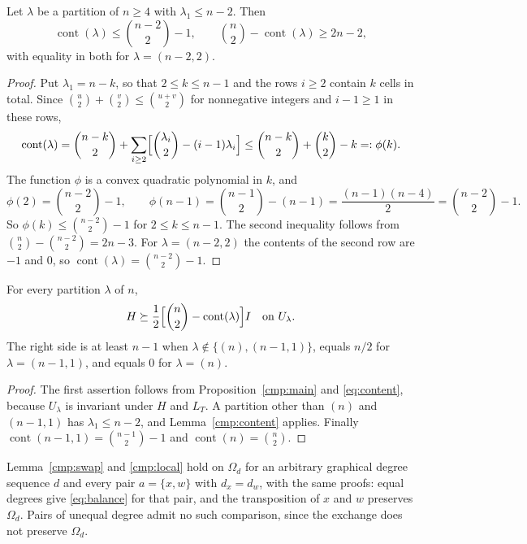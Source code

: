 \begin{lemma}\label{cmp:content}
Let $\lambda$ be a partition of $n\ge4$ with $\lambda_1\le n-2$. Then
\[
 \operatorname{cont}(\lambda)\le\binom{n-2}2-1,\qquad
 \binom n2-\operatorname{cont}(\lambda)\ge2n-2,
\]
with equality in both for $\lambda=(n-2,2)$.
\end{lemma}

\begin{proof}
Put $\lambda_1=n-k$, so that $2\le k\le n-1$ and the rows $i\ge2$ contain $k$
cells in total. Since $\binom u2+\binom v2\le\binom{u+v}2$ for nonnegative
integers and $i-1\ge1$ in these rows,
\[
 \operatorname{cont}(\lambda)
 =\binom{n-k}2+\sum_{i\ge2}\Bigl[\binom{\lambda_i}2-(i-1)\lambda_i\Bigr]
 \le\binom{n-k}2+\binom k2-k=:\phi(k).
\]
The function $\phi$ is a convex quadratic polynomial in $k$, and
\[
 \phi(2)=\binom{n-2}2-1,\qquad
 \phi(n-1)=\binom{n-1}2-(n-1)=\frac{(n-1)(n-4)}2=\binom{n-2}2-1 .
\]
So $\phi(k)\le\binom{n-2}2-1$ for $2\le k\le n-1$. The second inequality
follows from $\binom n2-\binom{n-2}2=2n-3$. For $\lambda=(n-2,2)$ the contents
of the second row are $-1$ and $0$, so
$\operatorname{cont}(\lambda)=\binom{n-2}2-1$.
\end{proof}

\begin{proposition}\label{cmp:sectors}
For every partition $\lambda$ of $n$,
\[
 H\succeq\frac12\Bigl[\binom n2-\operatorname{cont}(\lambda)\Bigr]I
 \quad\text{on }U_\lambda .
\]
The right side is at least $n-1$ when $\lambda\notin\{(n),(n-1,1)\}$, equals
$n/2$ for $\lambda=(n-1,1)$, and equals $0$ for $\lambda=(n)$.
\end{proposition}

\begin{proof}
The first assertion follows from Proposition~\ref{cmp:main} and
\eqref{eq:content}, because $U_\lambda$ is invariant under $H$ and $L_T$. A
partition other than $(n)$ and $(n-1,1)$ has $\lambda_1\le n-2$, and
Lemma~\ref{cmp:content} applies. Finally
$\operatorname{cont}(n-1,1)=\binom{n-1}2-1$ and
$\operatorname{cont}(n)=\binom n2$.
\end{proof}

\begin{remark}\label{cmp:general}
Lemma~\ref{cmp:swap} and \eqref{cmp:local} hold on $\Omega_d$ for an arbitrary
graphical degree sequence $d$ and every pair $a=\{x,w\}$ with $d_x=d_w$, with
the same proofs: equal degrees give \eqref{eq:balance} for that pair, and the
transposition of $x$ and $w$ preserves $\Omega_d$. Pairs of unequal degree
admit no such comparison, since the exchange does not preserve $\Omega_d$.
\end{remark}
